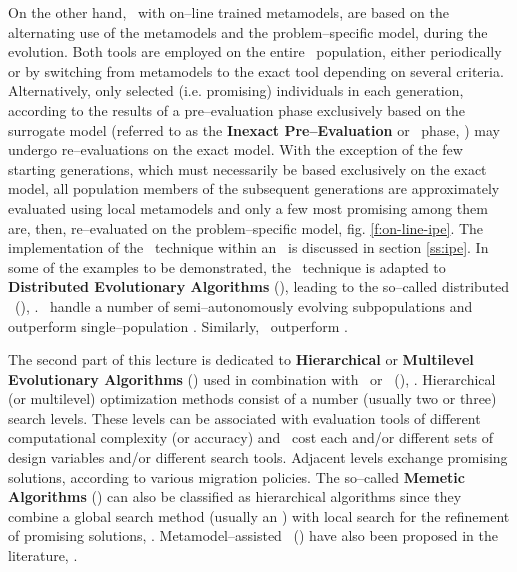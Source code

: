\documentclass{vki_ls}
\begin{document}
On the other hand, \MAEAs\ with on--line trained metamodels, are based on the alternating use of the metamodels and the problem--specific model, during the evolution. 
Both tools are employed on the entire \EA\ population, either periodically or by switching from metamodels to the exact tool \cite{Rat1999, Jin2002} depending on several criteria.
Alternatively, only selected (i.e. promising) individuals in each generation, according to the results of a pre--evaluation phase exclusively based on the surrogate model (referred to as the \textbf{Inexact Pre--Evaluation} or \IPE\ phase, \cite{LTT_2_023, LTT_2_029}) \cite{LTT_3_048, Ong2003b, Ulm2003, Brank2005} may undergo re--evaluations on the exact model. 
With the exception of the few starting generations, which must necessarily be based exclusively on the exact model, all population members of the subsequent generations are approximately evaluated using local metamodels and only a few most promising among them are, then, re--evaluated on the problem--specific model, fig. \ref{f:on-line-ipe}. 
The implementation of the \IPE\ technique within an \EA\ is discussed in section \ref{ss:ipe}.
In some of the examples to be demonstrated, the \IPE\ technique is adapted to \textbf{Distributed Evolutionary Algorithms} (\DEAs), leading to the so--called distributed \MAEAs\ (\DMAEAs), \cite{LTT_2_023}. 
\DEAs\ handle a number of semi--autonomously evolving subpopulations and outperform single--population \EAs. Similarly, \DMAEAs\ outperform \MAEAs.

The second part of this lecture is dedicated to \textbf{Hierarchical} or \textbf{Multilevel Evolutionary Algorithms} (\HEAs) used in combination with \MAEAs\ or \DMAEAs\ (\HDMAEAs), \cite{LTT_2_031, LTT_2_036, LTT_2_044, LTT_2_050, LTT_4_05}.
Hierarchical (or multilevel) optimization methods consist of a number (usually two or three) search levels. 
These levels can be associated with evaluation tools of different computational complexity (or accuracy) and \CPU\ cost each and/or different sets of design variables and/or different search tools. 
Adjacent levels exchange promising solutions, according to various migration 
policies. 
The so--called \textbf{Memetic Algorithms} (\MAs) can also be classified as hierarchical algorithms since they combine a global search method (usually an \EA) with local search for the refinement of promising solutions, 
\cite{Ong2004, Krans2005}. Metamodel--assisted \MAs\ (\MAMAs) have also been proposed in
the literature, \cite{Ong2003, Ong2006, LTT_2_043, LTT_4_04, LTT_2_053}.
 
\end{document}
